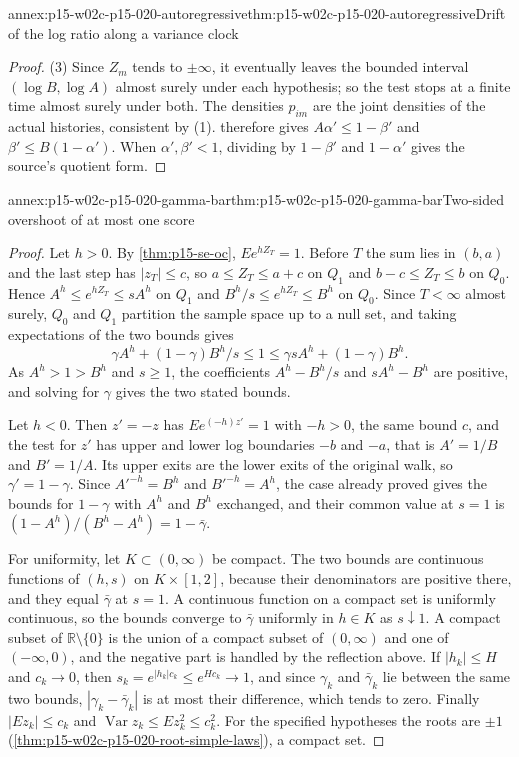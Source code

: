 \begin{annexitem}{annex:p15-w02c-p15-020-autoregressive}{thm:p15-w02c-p15-020-autoregressive}{Drift of the log ratio along a variance clock}
\begin{proof}
(3) Since \(Z_m\) tends to \(\pm\infty\), it eventually leaves the
bounded interval \((\log B,\log A)\) almost surely under each
hypothesis; so the test stops at a finite time almost surely under both.
The densities \(p_{im}\) are the joint densities of the actual
histories, consistent by (1).  therefore
gives \(A\alpha'\leq1-\beta'\) and \(\beta'\leq B(1-\alpha')\).
When \(\alpha',\beta'<1\), dividing by \(1-\beta'\) and \(1-\alpha'\)
gives the source's quotient form.
\end{proof}
\end{annexitem}

\begin{annexitem}{annex:p15-w02c-p15-020-gamma-bar}{thm:p15-w02c-p15-020-gamma-bar}{Two-sided overshoot of at most one score}
\begin{proof}
Let \(h>0\). By \cref{thm:p15-se-oc}, \(Ee^{hZ_T}=1\). Before \(T\) the
sum lies in \((b,a)\) and the last step has \(|z_T|\leq c\), so
\(a\leq Z_T\leq a+c\) on \(Q_1\) and \(b-c\leq Z_T\leq b\) on \(Q_0\).
Hence \(A^h\leq e^{hZ_T}\leq sA^h\) on \(Q_1\) and
\(B^h/s\leq e^{hZ_T}\leq B^h\) on \(Q_0\). Since \(T<\infty\) almost
surely, \(Q_0\) and \(Q_1\) partition the sample space up to a null
set, and taking expectations of the two bounds gives
\[
 \gamma A^h+(1-\gamma)B^h/s\leq1\leq\gamma sA^h+(1-\gamma)B^h .
\]
As \(A^h>1>B^h\) and \(s\geq1\), the coefficients \(A^h-B^h/s\) and
\(sA^h-B^h\) are positive, and solving for \(\gamma\) gives the two
stated bounds.

Let \(h<0\). Then \(z'=-z\) has \(Ee^{(-h)z'}=1\) with \(-h>0\), the
same bound \(c\), and the test for \(z'\) has upper and lower log
boundaries \(-b\) and \(-a\), that is \(A'=1/B\) and \(B'=1/A\). Its
upper exits are the lower exits of the original walk, so
\(\gamma'=1-\gamma\). Since \(A'^{-h}=B^h\) and \(B'^{-h}=A^h\), the
case already proved gives the bounds for \(1-\gamma\) with \(A^h\) and
\(B^h\) exchanged, and their common value at \(s=1\) is
\((1-A^h)/(B^h-A^h)=1-\bar\gamma\).

For uniformity, let \(K\subset(0,\infty)\) be compact. The two bounds
are continuous functions of \((h,s)\) on \(K\times[1,2]\), because
their denominators are positive there, and they equal \(\bar\gamma\)
at \(s=1\). A continuous function on a compact set is uniformly
continuous, so the bounds converge to \(\bar\gamma\) uniformly in
\(h\in K\) as \(s\downarrow1\). A compact subset of
\(\mathbb R\setminus\{0\}\) is the union of a compact subset of
\((0,\infty)\) and one of \((-\infty,0)\), and the negative part is
handled by the reflection above. If \(|h_k|\leq H\) and \(c_k\to0\),
then \(s_k=e^{|h_k|c_k}\leq e^{Hc_k}\to1\), and since \(\gamma_k\) and
\(\bar\gamma_k\) lie between the same two bounds,
\(|\gamma_k-\bar\gamma_k|\) is at most their difference, which tends
to zero. Finally \(|Ez_k|\leq c_k\) and \(\operatorname{Var}z_k\leq Ez_k^2\leq c_k^2\).
For the specified hypotheses the roots are \(\pm1\)
(\cref{thm:p15-w02c-p15-020-root-simple-laws}), a compact set.
\end{proof}
\end{annexitem}

